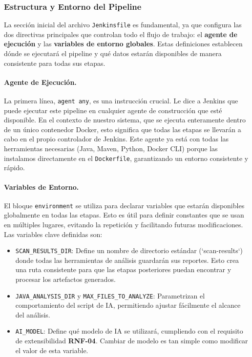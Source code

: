 \subsubsection{Estructura y Entorno del Pipeline}

La sección inicial del archivo \texttt{Jenkinsfile} es fundamental, ya que configura las dos directivas principales que controlan todo el flujo de trabajo: el \textbf{agente de ejecución} y las \textbf{variables de entorno globales}. Estas definiciones establecen dónde se ejecutará el pipeline y qué datos estarán disponibles de manera consistente para todas sus etapas.

\paragraph{Agente de Ejecución.} La primera línea, \texttt{agent any}, es una instrucción crucial. Le dice a Jenkins que puede ejecutar este pipeline en cualquier agente de construcción que esté disponible. En el contexto de nuestro sistema, que se ejecuta enteramente dentro de un único contenedor Docker, esto significa que todas las etapas se llevarán a cabo en el propio controlador de Jenkins. Este agente ya está con todas las herramientas necesarias (Java, Maven, Python, Docker CLI) porque las instalamos directamente en el \texttt{Dockerfile}, garantizando un entorno consistente y rápido.

\paragraph{Variables de Entorno.} El bloque \texttt{environment} se utiliza para declarar variables que estarán disponibles globalmente en todas las etapas. Esto es útil para definir constantes que se usan en múltiples lugares, evitando la repetición y facilitando futuras modificaciones. Las variables clave definidas son:
\begin{itemize}
    \item \texttt{SCAN\_RESULTS\_DIR}: Define un nombre de directorio estándar (`scan-results`) donde todas las herramientas de análisis guardarán sus reportes. Esto crea una ruta consistente para que las etapas posteriores puedan encontrar y procesar los artefactos generados.
    \item \texttt{JAVA\_ANALYSIS\_DIR} y \texttt{MAX\_FILES\_TO\_ANALYZE}: Parametrizan el comportamiento del script de IA, permitiendo ajustar fácilmente el alcance del análisis.
    \item \texttt{AI\_MODEL}: Define qué modelo de IA se utilizará, cumpliendo con el requisito de extensibilidad \textbf{RNF-04}. Cambiar de modelo es tan simple como modificar el valor de esta variable.
\end{itemize}


